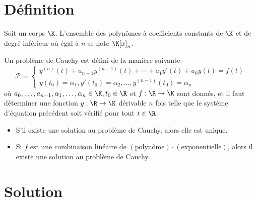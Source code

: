 
\section{Définition}

\begin{mynota}
	Soit un corps $\K$.
	L'ensemble des polynômes à coefficients constants de $\K$ et de degré inférieur où égal à $n$ se note $\K[x]_n$.
\end{mynota}

\begin{mydef}
	Un problème de Cauchy est défini de la manière suivante
	\[ \mathcal{P} = \left\{
	\begin{array}{l}
		y^{(n)}(t) + a_{n-1}y^{(n-1)}(t) + \cdots + a_1 y'(t) + a_0 y(t) = f(t) \\
		y(t_0) = \alpha_1, y'(t_0) = \alpha_2, \dots , y^{(n-1)}(t_0) = \alpha_n
	\end{array} \right.
	\]
	où $a_0, \dots, a_{n-1}, \alpha_1, \dots, \alpha_n \in \K, t_0 \in \R$ et $f: \R \to \K$ sont donnés,
	et il faut déterminer une fonction $y: \R \to \K$ dérivable $n$ fois
	telle que le système d'équation précédent soit vérifié pour tout $t \in \R$.
\end{mydef}

\begin{mytheo}\InsertTheoremBreak
	\begin{itemize}
		\item S'il existe une solution au problème de Cauchy, alors elle est unique.
		\item Si $f$ est une combinaison linéaire de $(\mathrm{polynôme})\cdot(\mathrm{exponentielle})$,
			alors il existe une solution au problème de Cauchy.
	\end{itemize}
\end{mytheo}

\section{Solution}

